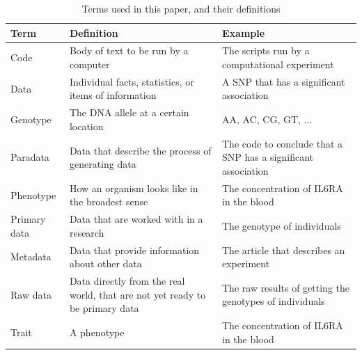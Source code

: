 \begin{table}[h]
  \begin{tabular}{lp{5cm}p{5cm}}
    Term      & Definition                                            & Example                                                         \\
    \hline
    Code      & Body of text to be run by a computer                  & The scripts run by a computational experiment                   \\
    Data      & Individual facts, statistics, or items of information & A SNP that has a significant association                        \\
    Genotype  & The DNA allele at a certain location                  & AA, AC, CG, GT, ...                                             \\
    Paradata  & Data that describe the process of generating data     & The code to conclude that a SNP has a significant association   \\
    Phenotype & How an organism looks like in the broadest sense      & The concentration of IL6RA in the blood                         \\
    Primary data & Data that are worked with in a research            & The genotype of individuals   \\
    Metadata  & Data that provide information about other data        & The article that describes an experiment                        \\
    Raw data  & Data directly from the real world, that are not yet ready to be primary data & The raw results of getting the genotypes of individuals   \\
    Trait     & A phenotype                                           & The concentration of IL6RA in the blood                         
  \end{tabular}
  \caption{Terms used in this paper, and their definitions}
  \label{tab:definitions}
\end{table}
